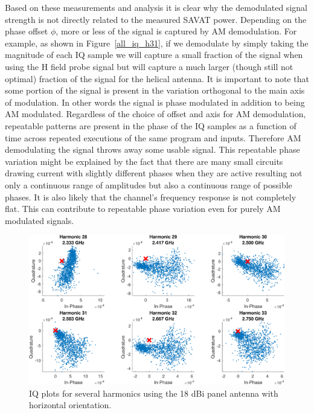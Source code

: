 Based on these measurements and analysis it is clear why the demodulated signal strength is not directly related to the measured SAVAT power. Depending on the phase offset $\phi$, more or less of the signal is captured by AM demodulation. For example, as shown in Figure~\ref{all_iq_h31}, if we demodulate by simply taking the magnitude of each IQ sample we will capture a small fraction of the signal when using the H field probe signal but will capture a much larger (though still not optimal) fraction of the signal for the helical antenna. It is important to note that some portion of the signal is present in the variation orthogonal to the main axis of modulation. In other words the signal is phase modulated in addition to being AM modulated. Regardless of the choice of offset and axis for AM demodulation, repeatable patterns are present in the phase of the IQ samples as a function of time across repeated executions of the same program and inputs. Therefore AM demodulating the signal throws away some usable signal. This repeatable phase variation might be explained by the fact that there are many small circuits drawing current with slightly different phases when they are active resulting not only a continuous range of amplitudes but also a continuous range of possible phases. It is also likely that the channel's frequency response is not completely flat. This can contribute to repeatable phase variation even for purely AM modulated signals. %

\begin{figure}
\includegraphics[width=\textwidth]{panel_iq_hx}
\caption{IQ plots for several harmonics using the 18 dBi panel antenna with horizontal orientation.}
\label{panel_iq_hx}
\end{figure}

